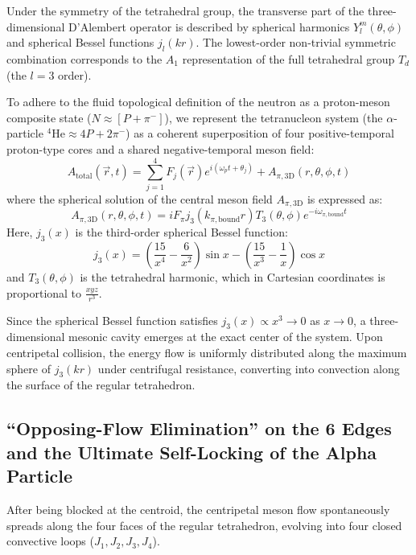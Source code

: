 \documentclass[12pt, a4paper]{article}
\begin{document}
Under the symmetry of the tetrahedral group, the transverse part of the three-dimensional D'Alembert operator is described by spherical harmonics $Y_l^m(\theta, \phi)$ and spherical Bessel functions $j_l(kr)$. The lowest-order non-trivial symmetric combination corresponds to the $A_1$ representation of the full tetrahedral group $T_d$ (the $l=3$ order).

To adhere to the fluid topological definition of the neutron as a proton-meson composite state ($N \approx [P + \pi^-]$), we represent the tetranucleon system (the $\alpha$-particle $^4\mathrm{He} \approx 4P + 2\pi^-$) as a coherent superposition of four positive-temporal proton-type cores and a shared negative-temporal meson field:
\begin{equation}
A_{\mathrm{total}}(\vec{r}, t) = \sum_{j = 1}^4 F_j(\vec{r}) e^{i(\omega_p t + \theta_j)} + A_{\pi, \mathrm{3D}}(r, \theta, \phi, t)
\end{equation}
where the spherical solution of the central meson field $A_{\pi, \mathrm{3D}}$ is expressed as:
\begin{equation}
A_{\pi, \mathrm{3D}}(r, \theta, \phi, t) = i F_\pi j_3(k_{\pi, \mathrm{bound}} r) T_3(\theta, \phi) e^{-i\omega_{\pi, \mathrm{bound}} t}
\end{equation}
Here, $j_3(x)$ is the third-order spherical Bessel function:
\begin{equation}
j_3(x) = \left( \frac{15}{x^4} - \frac{6}{x^2} \right) \sin x - \left( \frac{15}{x^3} - \frac{1}{x} \right) \cos x
\end{equation}
and $T_3(\theta, \phi)$ is the tetrahedral harmonic, which in Cartesian coordinates is proportional to $\frac{xyz}{r^3}$.

Since the spherical Bessel function satisfies $j_3(x) \propto x^3 \to 0$ as $x \to 0$, a three-dimensional mesonic cavity emerges at the exact center of the system. Upon centripetal collision, the energy flow is uniformly distributed along the maximum sphere of $j_3(kr)$ under centrifugal resistance, converting into convection along the surface of the regular tetrahedron.




\subsection{“Opposing-Flow Elimination” on the 6 Edges and the Ultimate Self-Locking of the Alpha Particle}

After being blocked at the centroid, the centripetal meson flow spontaneously spreads along the four faces of the regular tetrahedron, evolving into four closed convective loops ($J_1, J_2, J_3, J_4$).
\end{document}
